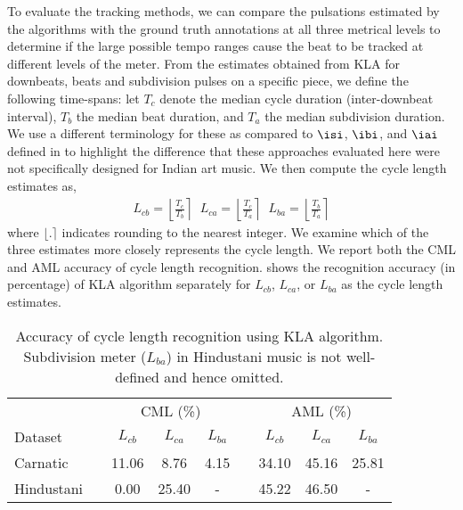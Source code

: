 To evaluate the tracking methods, we can compare the pulsations estimated by the algorithms with the ground truth annotations at all three metrical levels to determine if the large possible tempo ranges cause the beat to be tracked at different levels of the meter. From the estimates obtained from \acrshort{KLA} for downbeats, beats and subdivision pulses on a specific piece, we define the following time-spans: let $T_c$ denote the median cycle duration (inter-downbeat interval), $T_b$ the median beat duration, and $T_a$ the median subdivision duration. We use a different terminology for these as compared to $\isi$, $\ibi$, and $\iai$ defined in  to highlight the difference that these approaches evaluated here were not specifically designed for Indian art music. We then compute the cycle length estimates as, 
\begin{eqnarray}
L_{cb} = \left\lfloor \frac{T_c}{T_b} \right\rceil \nonumber \;\;
L_{ca} = \left\lfloor \frac{T_c}{T_a} \right\rceil \nonumber \;\;
L_{ba} = \left\lfloor \frac{T_b}{T_a} \right\rceil \nonumber
\end{eqnarray}
where $\lfloor.\rceil$ indicates rounding to the nearest integer. We examine which of the three estimates more closely represents the cycle length. We report both the \gls{CML} and \gls{AML} accuracy of cycle length recognition.  shows the recognition accuracy (in percentage) of \acrshort{KLA} algorithm separately for $L_{cb}$, $L_{ca}$, or $L_{ba}$ as the cycle length estimates. 
%
\begin{table}
\centering
\begin{tabular}{@{}lcccccccc@{}} \toprule
 & & \multicolumn{3}{c}{\acrshort{CML} (\%)} & & \multicolumn{3}{c}{\acrshort{AML} (\%)}\tabularnewline 
Dataset & & $L_{cb}$ & $L_{ca}$ & $L_{ba}$ & & $L_{cb}$ & $L_{ca}$ & $L_{ba}$ \tabularnewline \midrule
Carnatic & & 11.06 & 8.76 & 4.15 & & 34.10 & 45.16 & 25.81 \tabularnewline \addlinespace[3pt]
Hindustani & & 0.00 & 25.40 & - & & 45.22 & 46.50 & - \tabularnewline \bottomrule
\end{tabular}
\caption[Accuracy of cycle length recognition using \acrshort{KLA} algorithm]{Accuracy of cycle length recognition using \acrshort{KLA} algorithm. Subdivision meter ($L_{ba}$) in Hindustani music is not well-defined and hence omitted.}\label{tab:jnmreval:cycleKLA}
\end{table}
%
